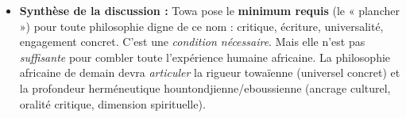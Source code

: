 \documentclass[11pt]{article}
\newcommand{\cle}[1]{{\popxbold\color{popdark}#1}}
\begin{document}
\begin{corrige}
\begin{itemize}
\begin{itemize}
\item \textbf{Le critère de l'\cle{écrit} :} Exclut-il les philosophies orales vivantes (griots, sages du palabre) qui \emph{argumentent}, \emph{critiquent}, \emph{universalisent} dans la langue du peuple ? Paulin Hountondji a nuancé : l'écrit est \emph{indispensable} pour la rigueur et la transmission dans la modernité, mais l'oralité philosophique existe et doit être \emph{transcrite} (métatexte), pas méprisée.
\end{itemize}
\item \textbf{Synthèse de la discussion :} Towa pose le \textbf{minimum requis} (le « plancher ») pour toute philosophie digne de ce nom : critique, écriture, universalité, engagement concret. C'est une \emph{condition nécessaire}. Mais elle n'est pas \emph{suffisante} pour combler toute l'expérience humaine africaine. La philosophie africaine de demain devra \emph{articuler} la rigueur towaïenne (universel concret) et la profondeur herméneutique hountondjienne/eboussienne (ancrage culturel, oralité critique, dimension spirituelle).
\end{itemize}
\end{corrige}
\end{document}
